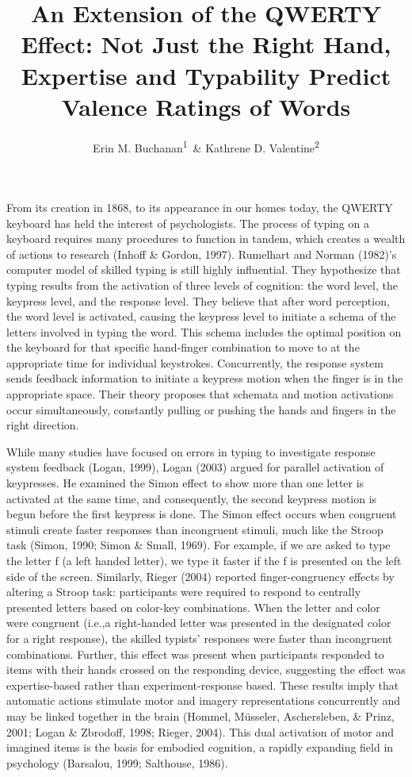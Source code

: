 \documentclass[english,man]{apa6}
\title{An Extension of the QWERTY Effect: Not Just the Right Hand, Expertise
and Typability Predict Valence Ratings of Words}
\author{Erin M. Buchanan\textsuperscript{1}~\& Kathrene D. Valentine\textsuperscript{2}}
\affiliation{
    \vspace{0.5cm}
          \textsuperscript{1} Missouri State University\\
          \textsuperscript{2} University of Missouri  }
\theoremstyle{definition}
\theoremstyle{definition}
\theoremstyle{definition}
\theoremstyle{remark}
\begin{document}
\maketitle

\setcounter{secnumdepth}{0}



From its creation in 1868, to its appearance in our homes today, the
QWERTY keyboard has held the interest of psychologists. The process of
typing on a keyboard requires many procedures to function in tandem,
which creates a wealth of actions to research (Inhoff \& Gordon, 1997).
Rumelhart and Norman (1982)'s computer model of skilled typing is still
highly influential. They hypothesize that typing results from the
activation of three levels of cognition: the word level, the keypress
level, and the response level. They believe that after word perception,
the word level is activated, causing the keypress level to initiate a
schema of the letters involved in typing the word. This schema includes
the optimal position on the keyboard for that specific hand-finger
combination to move to at the appropriate time for individual
keystrokes. Concurrently, the response system sends feedback information
to initiate a keypress motion when the finger is in the appropriate
space. Their theory proposes that schemata and motion activations occur
simultaneously, constantly pulling or pushing the hands and fingers in
the right direction.

While many studies have focused on errors in typing to investigate
response system feedback (Logan, 1999), Logan (2003) argued for parallel
activation of keypresses. He examined the Simon effect to show more than
one letter is activated at the same time, and consequently, the second
keypress motion is begun before the first keypress is done. The Simon
effect occurs when congruent stimuli create faster responses than
incongruent stimuli, much like the Stroop task (Simon, 1990; Simon \&
Small, 1969). For example, if we are asked to type the letter f (a left
handed letter), we type it faster if the f is presented on the left side
of the screen. Similarly, Rieger (2004) reported finger-congruency
effects by altering a Stroop task: participants were required to respond
to centrally presented letters based on color-key combinations. When the
letter and color were congruent (i.e.,a right-handed letter was
presented in the designated color for a right response), the skilled
typists' responses were faster than incongruent combinations. Further,
this effect was present when participants responded to items with their
hands crossed on the responding device, suggesting the effect was
expertise-based rather than experiment-response based. These results
imply that automatic actions stimulate motor and imagery representations
concurrently and may be linked together in the brain (Hommel, Müsseler,
Aschersleben, \& Prinz, 2001; Logan \& Zbrodoff, 1998; Rieger, 2004).
This dual activation of motor and imagined items is the basis for
embodied cognition, a rapidly expanding field in psychology (Barsalou,
1999; Salthouse, 1986).
\end{document}

